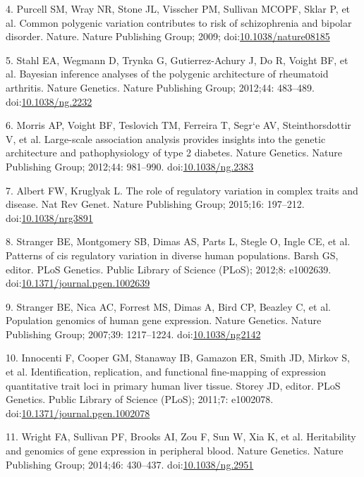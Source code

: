 \documentclass[]{article}
\begin{document}
4. Purcell SM, Wray NR, Stone JL, Visscher PM, Sullivan MCOPF, Sklar P,
et al. Common polygenic variation contributes to risk of schizophrenia
and bipolar disorder. Nature. Nature Publishing Group; 2009;
doi:\href{http://dx.doi.org/10.1038/nature08185}{10.1038/nature08185}

5. Stahl EA, Wegmann D, Trynka G, Gutierrez-Achury J, Do R, Voight BF,
et al. Bayesian inference analyses of the polygenic architecture of
rheumatoid arthritis. Nature Genetics. Nature Publishing Group; 2012;44:
483--489. doi:\href{http://dx.doi.org/10.1038/ng.2232}{10.1038/ng.2232}

6. Morris AP, Voight BF, Teslovich TM, Ferreira T, Segr{\a`e} AV,
Steinthorsdottir V, et al. Large-scale association analysis provides
insights into the genetic architecture and pathophysiology of type 2
diabetes. Nature Genetics. Nature Publishing Group; 2012;44: 981--990.
doi:\href{http://dx.doi.org/10.1038/ng.2383}{10.1038/ng.2383}

7. Albert FW, Kruglyak L. The role of regulatory variation in complex
traits and disease. Nat Rev Genet. Nature Publishing Group; 2015;16:
197--212. doi:\href{http://dx.doi.org/10.1038/nrg3891}{10.1038/nrg3891}

8. Stranger BE, Montgomery SB, Dimas AS, Parts L, Stegle O, Ingle CE, et
al. Patterns of cis regulatory variation in diverse human populations.
Barsh GS, editor. PLoS Genetics. Public Library of Science (PLoS);
2012;8: e1002639.
doi:\href{http://dx.doi.org/10.1371/journal.pgen.1002639}{10.1371/journal.pgen.1002639}

9. Stranger BE, Nica AC, Forrest MS, Dimas A, Bird CP, Beazley C, et al.
Population genomics of human gene expression. Nature Genetics. Nature
Publishing Group; 2007;39: 1217--1224.
doi:\href{http://dx.doi.org/10.1038/ng2142}{10.1038/ng2142}

10. Innocenti F, Cooper GM, Stanaway IB, Gamazon ER, Smith JD, Mirkov S,
et al. Identification, replication, and functional fine-mapping of
expression quantitative trait loci in primary human liver tissue. Storey
JD, editor. PLoS Genetics. Public Library of Science (PLoS); 2011;7:
e1002078.
doi:\href{http://dx.doi.org/10.1371/journal.pgen.1002078}{10.1371/journal.pgen.1002078}

11. Wright FA, Sullivan PF, Brooks AI, Zou F, Sun W, Xia K, et al.
Heritability and genomics of gene expression in peripheral blood. Nature
Genetics. Nature Publishing Group; 2014;46: 430--437.
doi:\href{http://dx.doi.org/10.1038/ng.2951}{10.1038/ng.2951}
\end{document}
